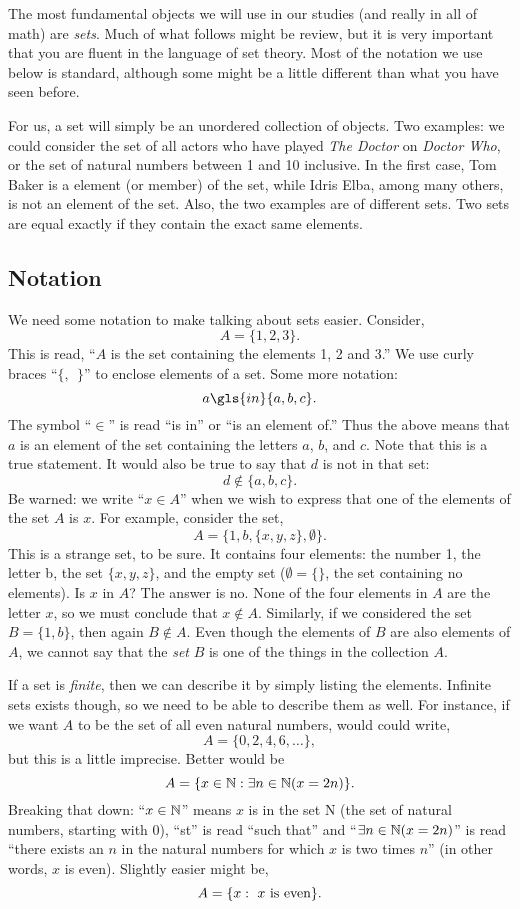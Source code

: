 \documentclass[12pt]{article}
\begin{document}
The most fundamental objects we will use in our studies (and really in all of math) are \emph{sets}.  Much of what follows might be review, but it is very important that you are fluent in the language of set theory.  Most of the notation we use below is standard, although some might be a little different than what you have seen before.

For us, a set will simply be an unordered collection of objects.  Two examples: we could consider the set of all actors who have played \textit{The Doctor} on \textit{Doctor Who}, or the set of natural numbers between 1 and 10 inclusive.  In the first case, Tom Baker is a element (or member) of the set, while Idris Elba, among many others, is not an element of the set.  Also, the two examples are of different sets.  Two sets are equal exactly if they contain the exact same elements.



\subsection{Notation}

We need some notation to make talking about sets easier.  Consider,
\[ A = \{1, 2, 3\}.\]
This is read, ``$A$ is the set containing the elements 1, 2 and 3.''  We use curly braces ``$\{,~~ \}$'' to enclose elements of a set.  Some more notation:
\[ a \gls{in} \{a, b, c\}. \]
The symbol ``$\in$'' is read ``is in'' or ``is an element of.''  Thus the above means that $a$ is an element of the set containing the letters $a$, $b$, and $c$.  Note that this is a true statement.  It would also be true to say that $d$ is not in that set:
\[ d \not\in \{a, b, c\}.\]
Be warned: we write ``$x \in A$'' when we wish to express that one of the elements of the set $A$ is $x$.  For example, consider the set,
\[A = \{1, b, \{x, y, z\}, \emptyset\}.\]
This is a strange set, to be sure. It contains four elements: the number 1, the letter b, the set $\{x,y,z\}$, and the empty set ($\emptyset = \{ \}$, the set containing no elements).  Is $x$ in $A$?  The answer is no.  None of the four elements in $A$ are the letter $x$, so we must conclude that $x \notin A$.  Similarly, if we considered the set $B = \{1,b\}$, then again $B \notin A$.  Even though the elements of $B$ are also elements of $A$, we cannot say that the \emph{set} $B$ is one of the things in the collection $A$.

If a set is \emph{finite}, then we can describe it by simply listing the elements.  Infinite sets exists though, so we need to be able to describe them as well.  For instance, if we want $A$ to be the set of all even natural numbers, would could write,
\[ A = \{0, 2, 4, 6, \ldots\},\]
but this is a little imprecise.  Better would be
\[ A = \{x \in \mathbb N : \exists n\in \mathbb N ( x = 2 n)\}.\]
Breaking that down: ``$x \in \mathbb N$'' means $x$ is in the set \gls{N} (the set of natural numbers, starting with 0), ``\gls{st}'' is read ``such that'' and ``$\exists n\in \mathbb N (x = 2n)$'' is read ``there exists an $n$ in the natural numbers for which $x$ is two times $n$'' (in other words, $x$ is even).  Slightly easier might be,
\[ A = \{x : \mbox{ $x$ is even}\}. \]
\end{document}
